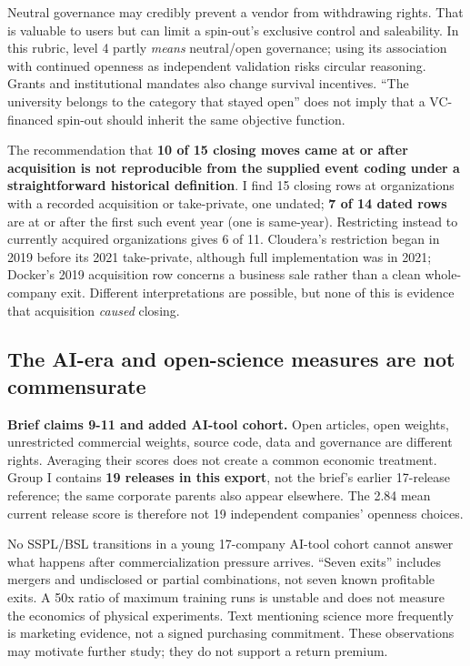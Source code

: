 Neutral governance may credibly prevent a vendor from withdrawing
rights. That is valuable to users but can limit a spin-out's exclusive
control and saleability. In this rubric, level 4 partly \emph{means}
neutral/open governance; using its association with continued openness
as independent validation risks circular reasoning. Grants and
institutional mandates also change survival incentives. ``The university
belongs to the category that stayed open'' does not imply that a
VC-financed spin-out should inherit the same objective function.

The recommendation that \textbf{10 of 15 closing moves came at or after
acquisition is not reproducible from the supplied event coding under a
straightforward historical definition}. I find 15 closing rows at
organizations with a recorded acquisition or take-private, one undated;
\textbf{7 of 14 dated rows} are at or after the first such event year
(one is same-year). Restricting instead to currently acquired
organizations gives 6 of 11. Cloudera's restriction began in 2019 before
its 2021 take-private, although full implementation was in 2021;
Docker's 2019 acquisition row concerns a business sale rather than a
clean whole-company exit. Different interpretations are possible, but
none of this is evidence that acquisition \emph{caused} closing.
\citep{InputData}

\subsection{The AI-era and open-science measures are not
commensurate}\label{the-ai-era-and-open-science-measures-are-not-commensurate}

\textbf{Brief claims 9-11 and added AI-tool cohort.} Open articles, open
weights, unrestricted commercial weights, source code, data and
governance are different rights. Averaging their scores does not create
a common economic treatment. Group I contains \textbf{19 releases in
this export}, not the brief's earlier 17-release reference; the same
corporate parents also appear elsewhere. The 2.84 mean current release
score is therefore not 19 independent companies' openness choices.

No SSPL/BSL transitions in a young 17-company AI-tool cohort cannot
answer what happens after commercialization pressure arrives. ``Seven
exits'' includes mergers and undisclosed or partial combinations, not
seven known profitable exits. A 50x ratio of maximum training runs is
unstable and does not measure the economics of physical experiments.
Text mentioning science more frequently is marketing evidence, not a
signed purchasing commitment. These observations may motivate further
study; they do not support a return premium.

